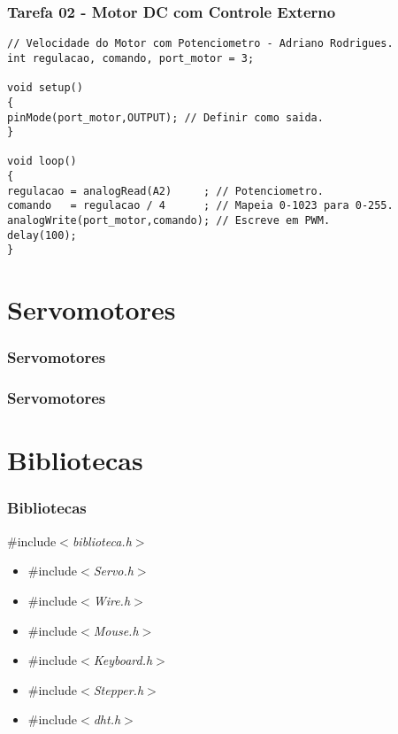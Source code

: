 \documentclass{beamer}
\begin{document}
\begin{frame}[fragile]
	\frametitle{Tarefa 02 - Motor DC com Controle Externo}
	\begin{lstlisting}[style=Arduino,basicstyle=\scriptsize \ttfamily]
// Velocidade do Motor com Potenciometro - Adriano Rodrigues.
int regulacao, comando, port_motor = 3;

void setup()
{
pinMode(port_motor,OUTPUT); // Definir como saida.
}

void loop()
{
regulacao = analogRead(A2)     ; // Potenciometro.
comando   = regulacao / 4      ; // Mapeia 0-1023 para 0-255.
analogWrite(port_motor,comando); // Escreve em PWM.
delay(100);
}	\end{lstlisting}
\end{frame}

\section{Servomotores}
\begin{frame}
	\frametitle{Servomotores}
	\begin{center}
	\end{center}
\end{frame}

\begin{frame}
	\frametitle{Servomotores}
	\begin{center}
	\end{center}
\end{frame}

\section{Bibliotecas}
\begin{frame}
	\frametitle{Bibliotecas}
	\#include$<$\textit{biblioteca.h}$>$
	\begin{itemize}
	\item \#include$<$\textit{Servo.h}$>$
	\item \#include$<$\textit{Wire.h}$>$
	\item \#include$<$\textit{Mouse.h}$>$
	\item \#include$<$\textit{Keyboard.h}$>$
	\item \#include$<$\textit{Stepper.h}$>$
	\item \#include$<$\textit{dht.h}$>$
	\end{itemize}
\end{frame}
\end{document}
